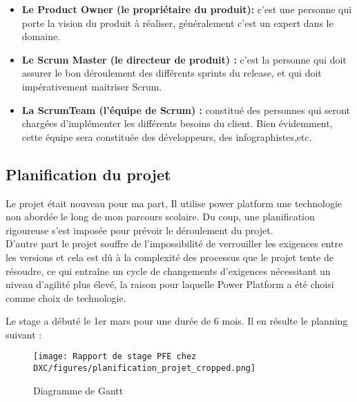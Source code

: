 \begin{itemize}
  \item \textbf{Le Product Owner (le propriétaire du produit):}
        c’est une personne qui porte la vision du produit à réaliser, généralement c’est un expert dans le domaine.
    \\
    \item \textbf{Le Scrum Master (le directeur de produit) :}
        c'est la personne qui doit assurer le bon déroulement des différents sprints du release, et qui doit impérativement maitriser Scrum.
    \\    
    \item \textbf{La ScrumTeam (l’équipe de Scrum) :}
        constitué des personnes qui seront
        chargées d’implémenter les différents besoins du client. Bien
        évidemment, cette équipe sera constituée des développeurs, des
        infographistes,etc.
    \\    

\end{itemize}



\subsection{Planification du projet}

Le projet était nouveau pour ma part, Il utilise power platform une technologie non abordée le long de mon parcours scolaire. Du coup, une planification rigoureuse s’est imposée pour prévoir le déroulement du projet.
\\ 
D'autre part le projet souffre de l'impossibilité de verrouiller les exigences entre les versions et cela est dû à la complexité des processus que le projet tente de résoudre, ce qui entraîne un cycle de changements d'exigences nécessitant un niveau d'agilité plus élevé, la raison pour laquelle Power Platform a été choisi comme choix de technologie.

Le stage a débuté le 1er mars pour une durée de 6 mois. Il en résulte le planning
suivant :

\begin{figure}[!h]
    \centering
    \texttt{[image: Rapport de stage PFE chez DXC/figures/planification\_projet\_cropped.png]}
    \caption{Diagramme de Gantt}
\end{figure}




